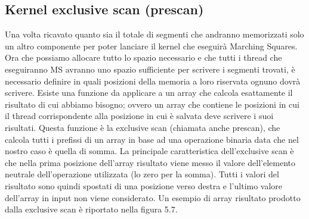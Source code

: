 \documentclass[12pt,a4paper]{report}
\begin{document}
\subsection{Kernel exclusive scan (prescan)}
Una volta ricavato quanto sia il totale di segmenti che andranno memorizzati solo un altro componente per poter lanciare il kernel che eseguirà Marching Squares. \newline
Ora che possiamo allocare tutto lo spazio necessario e che tutti i thread che eseguiranno MS avranno uno spazio sufficiente per scrivere i segmenti trovati, è necessario definire in quali posizioni della memoria a loro riservata ognuno dovrà scrivere. \newline
Esiste una funzione da applicare a un array che calcola esattamente il risultato di cui abbiamo bisogno; ovvero un array che contiene le posizioni in cui il thread corrispondente alla posizione in cui è salvata deve scrivere i suoi risultati.
Questa funzione è la exclusive scan (chiamata anche prescan), che calcola tutti i prefissi di un array in base ad una operazione binaria data che nel nostro caso è quella di somma. \newline
La principale caratteristica dell'exclusive scan è che nella prima posizione dell'array risultato viene messo il valore dell'elemento neutrale dell'operazione utilizzata (lo zero per la somma). Tutti i valori del risultato sono quindi spostati di una posizione verso destra e l'ultimo valore dell'array in input non viene considerato. Un esempio di array risultato prodotto dalla exclusive scan è riportato nella figura 5.7.
\end{document}
